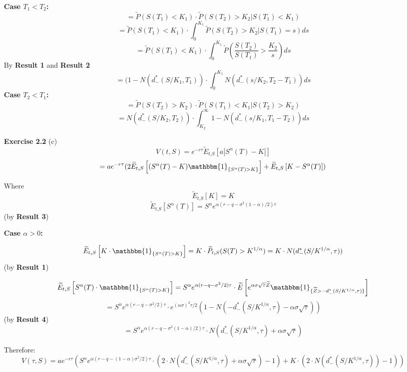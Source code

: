 \documentclass{article}[12pt,a4paper]
\begin{document}
\begin{enumerate}
  \textbf{Case $T_1 < T_2$:}
  $$ = \widetilde{P}(S(T_1) < K_1) \cdot \widetilde{P}(S(T_2) > K_2 | S(T_1) < K_1)$$
  $$
  = \widetilde{P}(S(T_1) < K_1) \cdot
  \int_0^{K_1}{\widetilde{P}(S(T_2) > K_2 | S(T_1) = s) ds}
  $$
  $$
  = \widetilde{P}(S(T_1) < K_1) \cdot \int_0^{K_1}{\widetilde{P}(\frac{S(T_2)}{S(T_1)} > \frac{K_2}{s})ds}
  $$
  By \textbf{Result 1} and \textbf{Result 2}
  $$
  =  (1 - N(d_-^*(S/K_1, T_1)) \cdot \int_0^{K_1}{N(d_-^*(s/K_2, T_2 - T_1))ds}
  $$
  \textbf{Case $T_2 < T_1$:}
  $$ = \widetilde{P}(S(T_2) > K_2) \cdot \widetilde{P}(S(T_1) < K_1 | S(T_2) > K_2)$$
  $$ = N(d_-^*(S/K_2, T_2)) \cdot \int_{K_2}^{\infty}{1 - N(d_-^*(s/K_1, T_1 - T_2))ds}$$ \newline
  
  \item[\textbf{Exercise 2.2}]
  (c)
  $$ V(t,S) = e^{-r\tau} \widetilde{E}_{t\mbox{,}S}\left[ a|S^{\alpha}(T) - K|\right]$$
  $$
  = a e^{-r\tau} (2\widetilde{E}_{t\mbox{,}S}\left[ (S^{\alpha}(T) - K)  
  \mathbbm{1}_{\{ S^\alpha(T) > K \}} \right]
  + \widetilde{E}_{t\mbox{,}S}\left[K - S^{\alpha}(T) \right])
  $$
  
  Where
  $$
   \widetilde{E}_{t\mbox{,}S}\left[K \right] = K
  $$
   $$
   \widetilde{E}_{t\mbox{,}S}\left[ S^{\alpha}(T) \right] =  S^\alpha e^{\alpha(r - q - \sigma^2(1  - \alpha)/2 )\tau}
  $$
  \hfill (by \textbf{Result 3})
  
  \textbf{Case $\alpha > 0$:}
  
  $$
  \widetilde{E}_{t\mbox{,}S} \left[ K \cdot \mathbbm{1}_{\{ S^\alpha(T) > K \}} \right]
  = K \cdot \widetilde{P}_{t\mbox{,}S}(S(T) > K^{1/\alpha})
  = K \cdot N(d_-^*(S/K^{1/\alpha}, \tau))
  $$
  \hfill (by \textbf{Result 1})
  
  $$
  \widetilde{E}_{t\mbox{,}S} \left[ S^{\alpha}(T) \cdot  \mathbbm{1}_{\{ S^\alpha(T) > K \}} \right] 
	  = S^\alpha e^{\alpha (r - q -\sigma^2/2) \tau} \cdot \widetilde{E} 
	  \left[ e^{\alpha\sigma\sqrt\tau \widetilde{Z}}  
	  \mathbbm{1}_{\{ \widetilde{Z} > -d_-^*(S/K^{1/\alpha}, \tau) \}} \right]
  $$
  $$
  = S^\alpha e^{\alpha (r - q - \sigma^2/2)\tau}\cdot e^{(\alpha\sigma)^2\tau/2} 
  (1 - N(-d_-^*(S/K^{1/\alpha}, \tau) - \alpha\sigma\sqrt\tau ))
  $$
  \hfill (by \textbf{Result 4})
  $$
    = S^\alpha e^{\alpha (r - q - \sigma^2(1 - \alpha)/2)\tau}
    \cdot N(d_-^*(S/K^{1/\alpha}, \tau) + \alpha\sigma\sqrt\tau )
  $$
  
  Therefore: 
  $$V(\tau, S) = ae^{-r\tau}(
  S^\alpha e^{\alpha (r - q - (1 - \alpha)\sigma^2/2)\tau} \cdot 
  (2 \cdot N(d_-^*(S/K^{1/\alpha}, \tau) + \alpha\sigma\sqrt\tau ) - 1)
  + K \cdot (2 \cdot N(d_-^*(S/K^{1/\alpha}, \tau))  - 1))$$ 
  

\end{enumerate}
\end{document}
